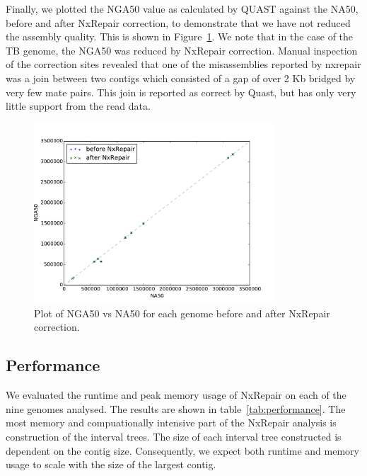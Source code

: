 \documentclass[fleqn,10pt]{wlpeerj}
\begin{document}
Finally, we plotted the NGA50 value as calculated by QUAST against the NA50, before and after NxRepair correction, to demonstrate that we have not reduced the assembly quality. This is shown in Figure~\ref{fig:NGA50}. We note that in the case of the TB genome, the NGA50 was reduced by NxRepair correction. Manual inspection of the correction sites revealed that one of the misassemblies reported by nxrepair was a join between two contigs which consisted of a gap of over 2 Kb bridged by very few mate pairs. This join is reported as correct by Quast, but has only very little support from the read data.

\begin{figure}
\centerline{\includegraphics[width=0.8\textwidth]{ng50.pdf}}
\caption{Plot of NGA50 vs NA50 for each genome before and after NxRepair correction.\label{fig:NGA50}}
\end{figure}

\subsection*{Performance}
We evaluated the runtime and peak memory usage of NxRepair on each of the nine genomes analysed. The results are shown in table~\ref{tab:performance}. The most memory and compuationally intensive part of the NxRepair analysis is construction of the interval trees. The size of each interval tree constructed is dependent on the contig size. Consequently, we expect both runtime and memory usage to scale with the size of the largest contig. 
\end{document}
